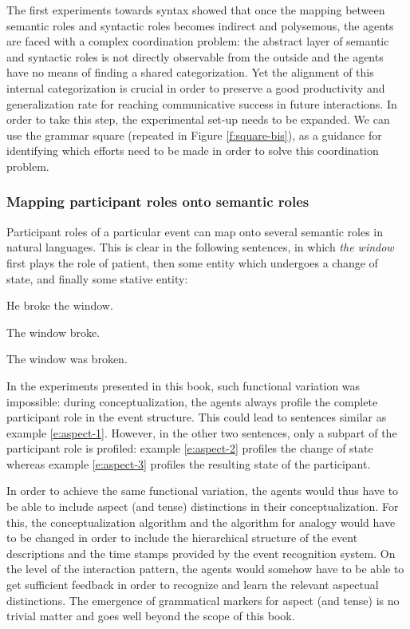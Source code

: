 The first experiments towards syntax showed that once the mapping between semantic roles and syntactic roles becomes indirect and polysemous, the agents are faced with a complex coordination problem: the abstract layer of semantic and syntactic roles is not directly observable from the outside and the agents have no means of finding a shared categorization. Yet the alignment of this internal categorization is crucial in order to preserve a good productivity and generalization rate for reaching communicative success in future interactions. In order to take this step, the experimental set-up needs to be expanded. We can use the grammar square (repeated in Figure \ref{f:square-bis}), as a guidance for identifying which efforts need to be made in order to solve this coordination problem.


\subsubsection{Mapping participant roles onto semantic roles}
 Participant roles of a particular event can map onto several semantic roles in natural languages. This is clear in the following sentences, in which {\em the window} first plays the role of patient, then some entity which undergoes a change of state, and finally some stative entity:

\ea
He broke the window.
\label{e:aspect-1}
\item The window broke.
\label{e:aspect-2}
\item The window was broken.
\label{e:aspect-3}
\z

In the experiments presented in this book, such functional variation was impossible: during conceptualization, the agents always profile the complete participant role in the event structure. This could lead to sentences similar as example \ref{e:aspect-1}. However, in the other two sentences, only a subpart of the participant role is profiled: example \ref{e:aspect-2} profiles the change of state whereas example \ref{e:aspect-3} profiles the resulting state of the participant.

In order to achieve the same functional variation, the agents would thus have to be able to include aspect (and tense) distinctions in their conceptualization. For this, the conceptualization algorithm and the algorithm for analogy would have to be changed in order to include the hierarchical structure of the event descriptions and the time stamps provided by the event recognition system. On the level of the interaction pattern, the agents would somehow have to be able to get sufficient feedback in order to recognize and learn the relevant aspectual distinctions. The emergence of grammatical markers for aspect (and tense) is no trivial matter and goes well beyond the scope of this book.


